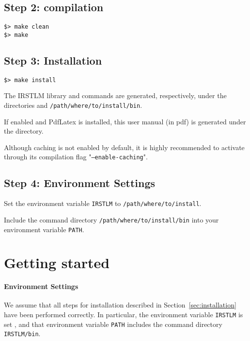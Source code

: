 \documentclass[11pt]{article}
\begin{document}
\subsection{Step 2: compilation}

\begin{verbatim}
$> make clean
$> make
\end{verbatim}

\subsection{Step 3: Installation}
\begin{verbatim}
$> make install
\end{verbatim}

\noindent
The IRSTLM library and commands are generated,  respectively, under the directories and {\tt /path/where/to/install/bin}.

\noindent
If enabled and PdfLatex is installed, this user manual (in pdf) is generated under the directory.

\noindent
Although caching is not enabled by default, it is highly recommended
to activate through its compilation flag "{\tt --enable-caching}".


\subsection{Step 4: Environment Settings}
Set the environment variable {\tt IRSTLM} to {\tt /path/where/to/install}.

\noindent
Include the command directory {\tt /path/where/to/install/bin} into your environment variable {\tt PATH}.

\newpage
\section{Getting started}

\paragraph{Environment Settings}
We assume that all steps for installation described in Section~\ref{sec:installation} have been performed correctly. In particular, the environment variable {\tt IRSTLM} is set , and that environment variable {\tt PATH} includes the command directory {\tt IRSTLM/bin}.
\end{document}

